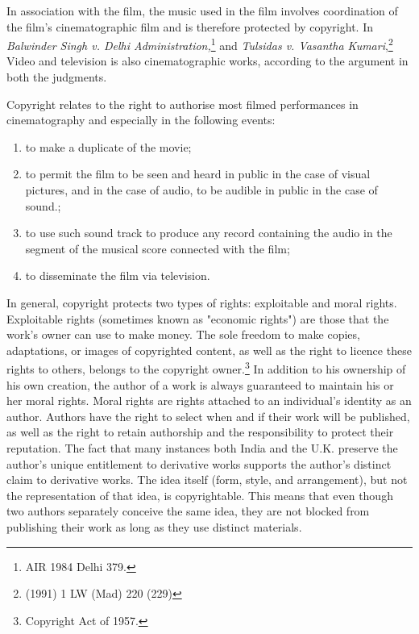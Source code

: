 \begin{multicols}{2}
\noi
In association with the film, the music used in the film involves coordination of the film's
cinematographic film and is therefore protected by copyright. In \textit{Balwinder Singh v. Delhi
Administration,}\footnote{AIR 1984 Delhi 379.} and \textit{Tulsidas v. Vasantha Kumari},\footnote{(1991) 1 LW (Mad) 220 (229)} Video and television is also
cinematographic works, according to the argument in both the judgments.

\newpage
\noi
Copyright relates to the right to authorise most filmed performances in cinematography and
especially in the following events:

\begin{enumerate}[label=$\bullet$]
\itemsep=0pt
\item to make a duplicate of the movie;

\item to permit the film to be seen and heard in public in the case of visual pictures, and in
the case of audio, to be audible in public in the case of sound.;

\item to use such sound track to produce any record containing the audio in the segment of
the musical score connected with the film;

\item to disseminate the film via television.
\end{enumerate}

\vspace{-.2cm}

\noi
In general, copyright protects two types of rights: exploitable and moral rights. Exploitable
rights (sometimes known as "economic rights") are those that the work's owner can use to
make money. The sole freedom to make copies, adaptations, or images of copyrighted
content, as well as the right to licence these rights to others, belongs to the copyright owner.\footnote{Copyright Act of 1957.}
In addition to his ownership of his own creation, the author of a work is always guaranteed to
maintain his or her moral rights. Moral rights are rights attached to an individual's identity as
an author. Authors have the right to select when and if their work will be published, as well
as the right to retain authorship and the responsibility to protect their reputation. The fact that
many instances both India and the U.K. preserve the author's unique entitlement to derivative
works supports the author's distinct claim to derivative works. The idea itself (form, style,
and arrangement), but not the representation of that idea, is copyrightable. This means that
even though two authors separately conceive the same idea, they are not blocked from
publishing their work as long as they use distinct materials.


\end{multicols}
